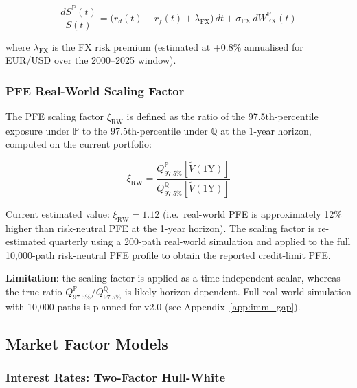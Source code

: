 \documentclass[11pt,a4paper]{article}
\begin{document}
\begin{equation}
  \frac{dS^{\mathbb{P}}(t)}{S(t)}
    = \bigl(r_d(t) - r_f(t) + \lambda_{\text{FX}}\bigr)\,dt
    + \sigma_{\text{FX}}\,dW_{\text{FX}}^{\mathbb{P}}(t)
  \label{eq:fx_rw}
\end{equation}

where $\lambda_{\text{FX}}$ is the FX risk premium (estimated at
$+0.8\%$ annualised for EUR/USD over the 2000--2025 window).

\subsubsection{PFE Real-World Scaling Factor}

The PFE scaling factor $\xi_{\text{RW}}$ is defined as the ratio of the
97.5th-percentile exposure under $\mathbb{P}$ to the 97.5th-percentile under
$\mathbb{Q}$ at the 1-year horizon, computed on the current portfolio:

\begin{equation}
  \xi_{\text{RW}} = \frac{Q_{97.5\%}^{\mathbb{P}}\!\left[\tilde{V}(1\text{Y})\right]}
                         {Q_{97.5\%}^{\mathbb{Q}}\!\left[\tilde{V}(1\text{Y})\right]}
  \label{eq:rw_scale}
\end{equation}

Current estimated value: $\xi_{\text{RW}} = 1.12$ (i.e.\ real-world PFE is
approximately 12\% higher than risk-neutral PFE at the 1-year horizon). The
scaling factor is re-estimated quarterly using a 200-path real-world
simulation and applied to the full 10,000-path risk-neutral PFE profile
to obtain the reported credit-limit PFE.

\textbf{Limitation}: the scaling factor is applied as a time-independent
scalar, whereas the true ratio $Q_{97.5\%}^{\mathbb{P}} / Q_{97.5\%}^{\mathbb{Q}}$
is likely horizon-dependent. Full real-world simulation with 10,000 paths is
planned for v2.0 (see Appendix~\ref{app:imm_gap}).

\subsection{Market Factor Models}
\label{sec:market_models}

\subsubsection{Interest Rates: Two-Factor Hull-White}
\end{document}
